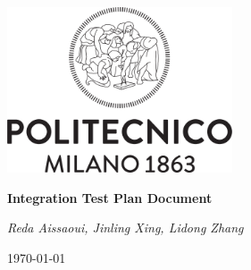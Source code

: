 \begin{titlepage}
\centering
\includegraphics[width=0.50\textwidth]{RASD/resources/logo_polimi.png}\par
\vspace{1.5cm}
{\LARGE \textbf{Integration Test Plan Document} \par}
\vspace{0.2cm}
{\large {}\par}
\vspace{1.0cm}
{\large\itshape Reda Aissaoui,  Jinling Xing,  Lidong Zhang\par}
\vspace{2cm}
\vfill
{\large \today \par}
\end{titlepage}
